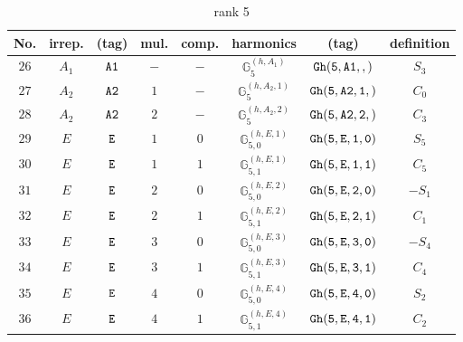 \documentclass[fleqn,8pt]{jsarticle}
\begin{document}
\begin{table}[ht!]
\begin{center}
\caption{rank 5}
\renewcommand{\arraystretch}{1.3}
\begin{tabular}{cccccccc} \hline \hline
No. & irrep. & (tag) & mul. & comp. & harmonics & (tag) & definition \\ \hline
$ 26 $ & $ A_{1} $ & $ {\tt A1} $ & $ - $ & $ - $ & $ \mathbb{G}_{5}^{(h,A_{1})} $ & $ {\tt Gh(5,A1,,)} $ & $ S_{3} $ \\
$ 27 $ & $ A_{2} $ & $ {\tt A2} $ & $ 1 $ & $ - $ & $ \mathbb{G}_{5}^{(h,A_{2},1)} $ & $ {\tt Gh(5,A2,1,)} $ & $ C_{0} $ \\
$ 28 $ & $ A_{2} $ & $ {\tt A2} $ & $ 2 $ & $ - $ & $ \mathbb{G}_{5}^{(h,A_{2},2)} $ & $ {\tt Gh(5,A2,2,)} $ & $ C_{3} $ \\
$ 29 $ & $ E $ & $ {\tt E} $ & $ 1 $ & $ 0 $ & $ \mathbb{G}_{5,0}^{(h,E,1)} $ & $ {\tt Gh(5,E,1,0)} $ & $ S_{5} $ \\
$ 30 $ & $ E $ & $ {\tt E} $ & $ 1 $ & $ 1 $ & $ \mathbb{G}_{5,1}^{(h,E,1)} $ & $ {\tt Gh(5,E,1,1)} $ & $ C_{5} $ \\
$ 31 $ & $ E $ & $ {\tt E} $ & $ 2 $ & $ 0 $ & $ \mathbb{G}_{5,0}^{(h,E,2)} $ & $ {\tt Gh(5,E,2,0)} $ & $ - S_{1} $ \\
$ 32 $ & $ E $ & $ {\tt E} $ & $ 2 $ & $ 1 $ & $ \mathbb{G}_{5,1}^{(h,E,2)} $ & $ {\tt Gh(5,E,2,1)} $ & $ C_{1} $ \\
$ 33 $ & $ E $ & $ {\tt E} $ & $ 3 $ & $ 0 $ & $ \mathbb{G}_{5,0}^{(h,E,3)} $ & $ {\tt Gh(5,E,3,0)} $ & $ - S_{4} $ \\
$ 34 $ & $ E $ & $ {\tt E} $ & $ 3 $ & $ 1 $ & $ \mathbb{G}_{5,1}^{(h,E,3)} $ & $ {\tt Gh(5,E,3,1)} $ & $ C_{4} $ \\
$ 35 $ & $ E $ & $ {\tt E} $ & $ 4 $ & $ 0 $ & $ \mathbb{G}_{5,0}^{(h,E,4)} $ & $ {\tt Gh(5,E,4,0)} $ & $ S_{2} $ \\
$ 36 $ & $ E $ & $ {\tt E} $ & $ 4 $ & $ 1 $ & $ \mathbb{G}_{5,1}^{(h,E,4)} $ & $ {\tt Gh(5,E,4,1)} $ & $ C_{2} $ \\
 \hline \hline
\end{tabular}
\end{center}
\end{table}
\end{document}
